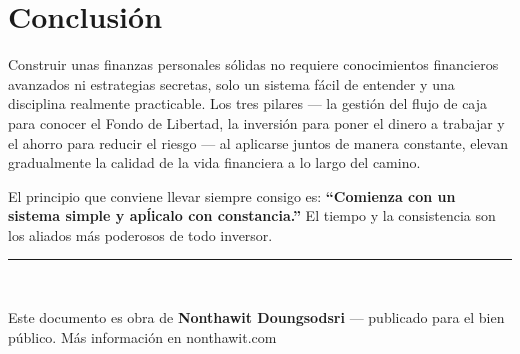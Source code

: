 \documentclass[10pt,a4paper,twocolumn]{article}
\begin{document}
\section{Conclusi\'on}
Construir unas finanzas personales s\'olidas no requiere conocimientos financieros avanzados ni estrategias secretas, solo un sistema f\'acil de entender y una disciplina realmente practicable. Los tres pilares --- la gesti\'on del flujo de caja para conocer el Fondo de Libertad, la inversi\'on para poner el dinero a trabajar y el ahorro para reducir el riesgo --- al aplicarse juntos de manera constante, elevan gradualmente la calidad de la vida financiera a lo largo del camino.

El principio que conviene llevar siempre consigo es: \textbf{``Comienza con un sistema simple y ap\'licalo con constancia.''} El tiempo y la consistencia son los aliados m\'as poderosos de todo inversor.

\vspace{1em}
\noindent\rule{\linewidth}{0.4pt}\\
{\small\raggedright Este documento es obra de \textbf{Nonthawit Doungsodsri} --- publicado para el bien p\'ublico. M\'as informaci\'on en nonthawit.com\par}
\end{document}
